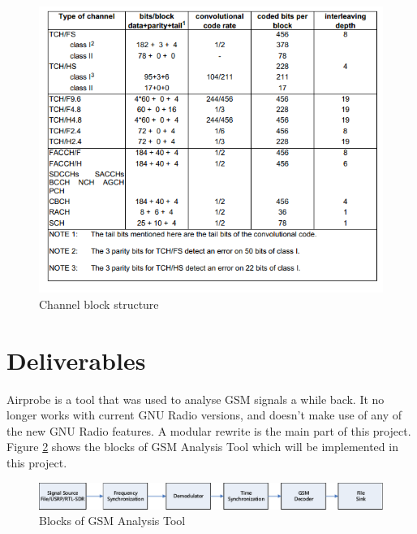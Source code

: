 \documentclass[a4paper,12pt,oneside]{article}
\begin{document}
\begin{figure}[h]
\centering\includegraphics[width=5in]{figure/coding.png}
\caption{Channel block structure \label{fig:coding} \cite{etsi199203}}
\end{figure}


\section{Deliverables}
Airprobe is a tool that was used to analyse GSM signals a while back. It no longer works with current GNU Radio versions, and doesn't make use of any of the new GNU Radio features. A modular rewrite is the main part of this project. Figure \ref{fig:3} shows the blocks of GSM Analysis Tool which will be implemented in this project.


\begin{figure}[!h]
\centering\includegraphics[width=5.4in]{figure/flowgraph.pdf}
\caption{Blocks of GSM Analysis Tool \label{fig:3}}
\end{figure}
\end{document}

